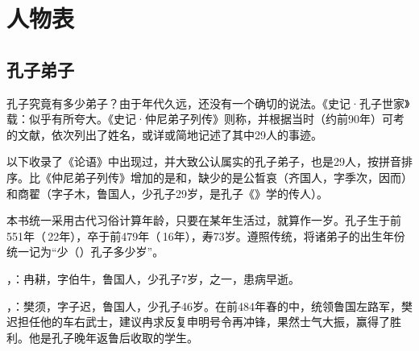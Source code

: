 \chapter*{人\quad 物\quad 表}



\lypdfbookmark\section*{孔子弟子}

孔子究竟有多少弟子？由于年代久远，还没有一个确切的说法。《史记·孔子世家》载：似乎有所夸大。《史记·仲尼弟子列传》则称，并根据当时（约前90年）可考的文献，依次列出了姓名，或详或简地记述了其中29人的事迹。

以下收录了《论语》中出现过，并大致公认属实的孔子弟子，也是29人，按拼音排序。比《仲尼弟子列传》增加的是和，缺少的是公晳哀（齐国人，字季次，因而）和商翟（字子木，鲁国人，少孔子29岁，是孔子《》学的传人）。

本书统一采用古代习俗计算年龄，只要在某年生活过，就算作一岁。孔子生于前551年（\,22年），卒于前479年（\,16年），寿73岁。遵照传统，将诸弟子的出生年份统一记为“少（）孔子多少岁”。

\bigskip

，：冉耕，字伯牛，鲁国人，少孔子7岁，之一，患病早逝。%

，：樊须，字子迟，鲁国人，少孔子46岁。在前484年春的中，统领鲁国左路军，樊迟担任他的车右武士，建议冉求反复申明号令再冲锋，果然士气大振，赢得了胜利。他是孔子晚年返鲁后收取的学生。

